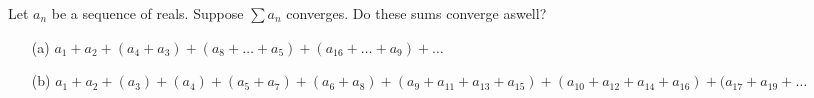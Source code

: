 Let \(a_n\) be a sequence of reals. Suppose \(\sum a_n\) converges. Do these sums converge aswell?
\begin{itemize}
\item[(a)] \(a_1+a_2+(a_4+a_3)+(a_8+\dots+a_5)+(a_{16}+\dots+a_9)+\dots\)
\item[(b)] \(a_1+a_2+(a_3)+(a_4)+(a_5+a_7)+(a_6+a_8)+(a_9+a_{11}+a_{13}+a_{15})+(a_{10}+a_{12}+a_{14}+a_{16})+(a_{17}+a_{19}+\dots\)
\end{itemize}
